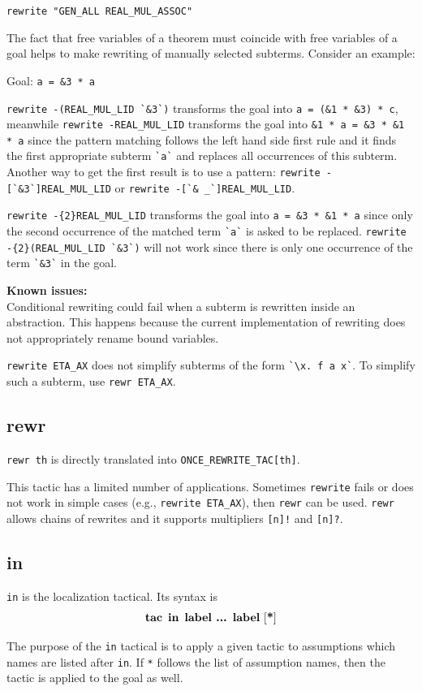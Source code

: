 \documentclass[a4paper]{article}
\newcommand{\issues}{{\bf Known issues:}\\}
\newcommand{\xx}[1]{\mathop{\text{\bf #1}}}
\begin{document}
\verb|rewrite "GEN_ALL REAL_MUL_ASSOC"|

The fact that free variables of a theorem must coincide with free variables of a goal helps to make rewriting of manually selected subterms. Consider an example:

Goal: \verb|a = &3 * a|

\verb|rewrite -(REAL_MUL_LID `&3`)| transforms the goal into \verb|a = (&1 * &3) * c|, meanwhile
\verb|rewrite -REAL_MUL_LID| transforms the goal into \verb|&1 * a = &3 * &1 * a| since the pattern matching follows the left hand side first rule and it finds the first appropriate subterm \verb|`a`| and replaces all occurrences of this subterm. Another way to get the first result is to use a pattern: \verb|rewrite -[`&3`]REAL_MUL_LID| or \verb|rewrite -[`& _`]REAL_MUL_LID|.

\verb|rewrite -{2}REAL_MUL_LID| transforms the goal into \verb|a = &3 * &1 * a| since only the second occurrence of the matched term \verb|`a`| is asked to be replaced. \verb|rewrite -{2}(REAL_MUL_LID `&3`)| will not work since there is only one occurrence of the term \verb|`&3`| in the goal.


\issues
Conditional rewriting could fail when a subterm is rewritten inside an abstraction. This happens because the current implementation of rewriting does not appropriately rename bound variables.

\verb|rewrite ETA_AX| does not simplify subterms of the form \verb|`\x. f a x`|. To simplify such a subterm, use \verb|rewr ETA_AX|.


\subsection{rewr}
\verb|rewr th| is directly translated into \verb|ONCE_REWRITE_TAC[th]|.

This tactic has a limited number of applications. Sometimes \verb|rewrite| fails or does not work in simple cases (e.g., \verb|rewrite ETA_AX|), then \verb|rewr| can be used. \verb|rewr| allows chains of rewrites and it supports multipliers \verb|[n]!| and \verb|[n]?|.

\subsection{in}
\verb'in' is the localization tactical. Its syntax is
\[
\xx{tac}\ \xx{in}\ \xx{label ... label}\ [\xx{*}]
\]

The purpose of the \verb'in' tactical is to apply a given tactic to assumptions which names are listed after \verb'in'. If \verb'*' follows the list of assumption names, then the tactic is applied to the goal as well.
\end{document}
